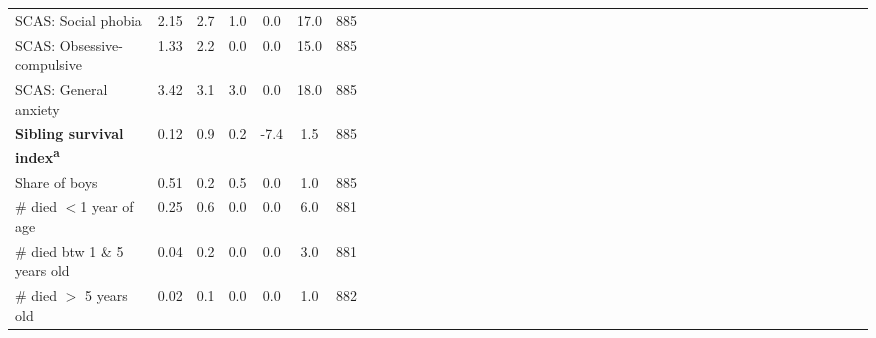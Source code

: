 {\begin{tabular}{l*{6}{ccccccc}}
\hspace{0.25cm} SCAS: Social phobia    &     2.15&      2.7&      1.0&      0.0&     17.0&      885\\
\hspace{0.25cm} SCAS: Obsessive-compulsive     &     1.33&      2.2&      0.0&      0.0&     15.0&      885\\
\hspace{0.25cm} SCAS: General anxiety  &     3.42&      3.1&      3.0&      0.0&     18.0&      885\\
\textbf{Sibling survival index\textsuperscript{a}}&     0.12&      0.9&      0.2&     -7.4&      1.5&      885\\
\hspace{0.25cm} Share of boys&     0.51&      0.2&      0.5&      0.0&      1.0&      885\\
\hspace{0.25cm} \# died $<$1 year of age&     0.25&      0.6&      0.0&      0.0&      6.0&      881\\
\hspace{0.25cm} \# died btw 1 \& 5 years old&     0.04&      0.2&      0.0&      0.0&      3.0&      881\\
\hspace{0.25cm} \# died $>$ 5 years old&     0.02&      0.1&      0.0&      0.0&      1.0&      882\\
\bottomrule
\end{tabular}
}

